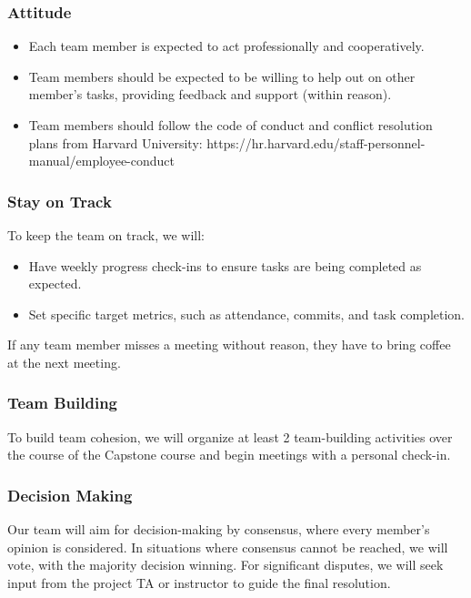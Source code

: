 \documentclass{article}
\begin{document}
\subsubsection*{Attitude}

\begin{itemize}
    \item Each team member is expected to act professionally and cooperatively.
    \item Team members should be expected to be willing to help out on other member's tasks, providing feedback and support (within reason).
    \item Team members should follow the code of conduct and conflict resolution plans from Harvard University:  https://hr.harvard.edu/staff-personnel-manual/employee-conduct
\end{itemize}


\subsubsection*{Stay on Track}

To keep the team on track, we will:
\begin{itemize}
    \item Have weekly progress check-ins to ensure tasks are being completed as expected.
    \item Set specific target metrics, such as attendance, commits, and task completion. 
\end{itemize}

If any team member misses a meeting without reason, they have to bring coffee at the next meeting.

\subsubsection*{Team Building}

To build team cohesion, we will organize at least 2 team-building activities over the course of the Capstone course and begin meetings with a personal check-in.

\subsubsection*{Decision Making} 

Our team will aim for decision-making by consensus, where every member's opinion is considered. In situations where consensus cannot be reached, we will vote, with the majority decision winning. For significant disputes, we will seek input from the project TA or instructor to guide the final resolution.
\end{document}
